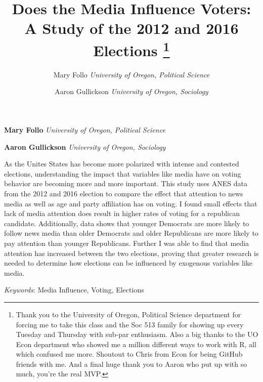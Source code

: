 \documentclass[11pt,]{article}
\title{Does the Media Influence Voters: A Study of the 2012 and 2016 Elections \thanks{Thank you to the University of Oregon, Political Science department for
forcing me to take this class and the Soc 513 family for showing up
every Tuesday and Thursday with sub-par enthusiasm. Also a big thanks to
the UO Econ department who showed me a million different ways to work
with R, all which confused me more. Shoutout to Chris from Econ for
being GitHub friends with me. And a final huge thank you to Aaron who
put up with so much, you're the real MVP.}  }
\author{\Large Mary Follo\vspace{0.05in} \newline\normalsize\emph{University of Oregon, Political Science}   \and \Large Aaron Gullickson\vspace{0.05in} \newline\normalsize\emph{University of Oregon, Sociology}  }
\date{}
\newcommand*{\authorfont}{\fontfamily{phv}\selectfont}
\renewenvironment{abstract}
 {{%
    \setlength{\leftmargin}{0mm}
    \setlength{\rightmargin}{\leftmargin}%
  }%
  \relax}
 {\endlist}
\begin{document}
	
%
\setcounter{page}{1}


{%
\setlength{\parindent}{0pt}
\thispagestyle{plain}
{\fontsize{18}{20}\selectfont\raggedright 
\maketitle  %

}

{
   \vskip 13.5pt\relax \normalsize\fontsize{11}{12} 
\textbf{\authorfont Mary Follo} \hskip 15pt \emph{\small University of Oregon, Political Science}   \par \textbf{\authorfont Aaron Gullickson} \hskip 15pt \emph{\small University of Oregon, Sociology}   

}

}







\begin{abstract}

    \hbox{\vrule height .2pt width 39.14pc}

    \vskip 8.5pt %

\noindent As the Unites States has become more polarized with intense and
contested elections, understanding the impact that variables like media
have on voting behavior are becoming more and more important. This study
uses ANES data from the 2012 and 2016 election to compare the effect
that attention to news media as well as age and party affiliation has on
voting. I found small effects that lack of media attention does result
in higher rates of voting for a republican candidate. Additionally, data
shows that younger Democrats are more likely to follow news media than
older Democrats and older Republicans are more likely to pay attention
than younger Republicans. Further I was able to find that media
attention has increased between the two elections, proving that greater
research is needed to determine how elections can be influenced by
exogenous variables like media.


\vskip 8.5pt \noindent \emph{Keywords}: Media Influence, Voting, Elections \par

    \hbox{\vrule height .2pt width 39.14pc}



\end{abstract}
\end{document}
